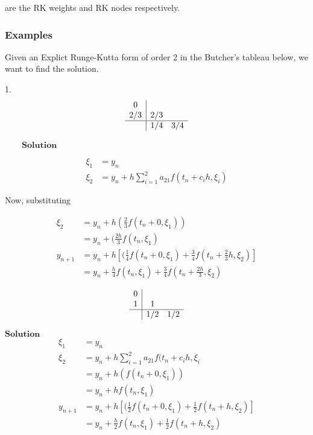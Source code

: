 \documentclass[12pt,a4paper]{article}
\begin{document}
are the RK weights and RK nodes respectively. 

\subsubsection{Examples}

Given an Explict Runge-Kutta form of order 2 in the Butcher's tableau below, we want to find the solution.

1. 
\begin{equation*} 
  \begin{array}{c|cc}
    0     \\
    2/3     &2/3   \\
    \hline
    \vspace{2pt}
    \,  & 1/4  & 3/4
  \end{array}
\end{equation*}

$\qquad \textbf{Solution}$

\begin{align*}
\xi_1 &= y_n \\
\xi_2 &= y_n + h\sum_{i=1}^2 a_{21} f(t_n + c_ih , \xi_i) 
\end{align*}

Now, substituting 

\begin{align*}
\xi_2 &= y_n + h(\frac{2}{3} f(t_n + 0 , \xi_1 )) \\
&= y_n + (\frac{2h}{3} f(t_n , \xi_1 )\\
y_{n+1} &= y_n + h [(\frac{1}{4} f (t_n + 0, \xi_1 ) + \frac{3}{4}f(t_n + \frac{2}{3}h , \xi_2 )] \\ 
&= y_n + \frac{h}{4} f (t_n , \xi_1 ) + \frac{3}{4}f(t_n + \frac{2h}{3} , \xi_2 )
\end{align*}

\begin{equation*}
  \begin{array}{c|cc}
    0     \\
    1     &1  \\
    \hline
    \vspace{2pt}
    \,  & 1/2  & 1/2
  \end{array}
\end{equation*}

$\textbf{Solution}$
\begin{align*}
\xi_1 &= y_n \\
\xi_2 &= y_n + h\sum_{i=1}^2 a_{21} f(t_n + c_ih , \xi_i \\ 
\quad   &= y_n + h( f(t_n + 0 , \xi_1 )) \\
&= y_n + h f(t_n , \xi_1 ) \\
y_{n+1} &= y_n + h [(\frac{1}{2} f (t_n + 0, \xi_1 ) + \frac{1}{2}f(t_n + h , \xi_2 )] \\
&= y_n + \frac{h}{2} f (t_n , \xi_1 ) + \frac{1}{2}f(t_n + h , \xi_2 )  
\end{align*}
\end{document}
